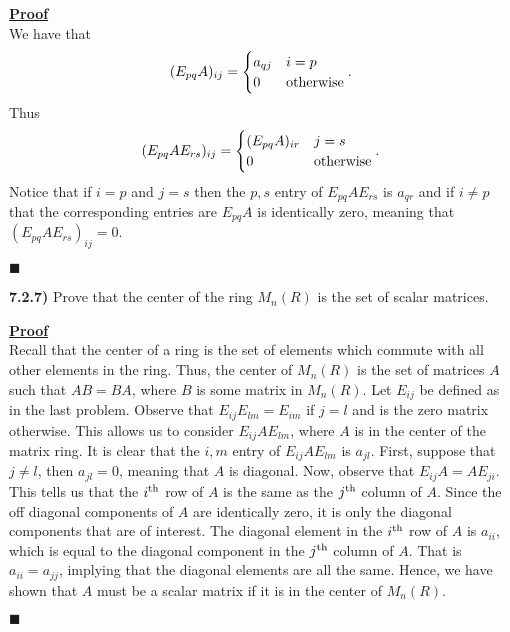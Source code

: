 \documentclass[12pt,a4paper]{article}
\newcommand{\prob}[2]{\textbf{#1)} #2}
\newenvironment{proof}
{
\textbf{\underline{Proof}} \\
}
{
\begin{flushright}
$\blacksquare$
\end{flushright}}
\begin{document}
\begin{proof}
    We have that
    \begin{align*}
        (E_{pq}A)_{ij} = \begin{cases}
            a_{qj} & i=p \\
            0 & {\rm otherwise}
        \end{cases}
    .\end{align*}   
    Thus 
    \begin{align*}
        (E_{pq}AE_{rs})_{ij} = \begin{cases}
            (E_{pq}A)_{ir} & j=s \\
            0 & {\rm otherwise}
        \end{cases}
    .\end{align*}
    Notice that if $i=p$ and $j=s$ then the $p,s$ entry of $E_{pq}AE_{rs}$ is $a_{qr}$ and if $i \ne p$ that the corresponding entries are $E_{pq}A$ is identically zero, meaning that $(E_{pq}AE_{rs})_{ij} = 0$.
\end{proof}

\prob{7.2.7}{
Prove that the center of the ring $M_{n}(R)$ is the set of scalar matrices.
}

\begin{proof}
    Recall that the center of a ring is the set of elements which commute with all other elements in the ring.
    Thus, the center of $M_{n}(R)$ is the set of matrices $A$ such that $AB = BA$, where $B$ is some matrix in $M_{n}(R)$.
    Let $E_{ij}$ be defined as in the last problem.
    Observe that $E_{ij}E_{lm} = E_{im}$ if $j=l$ and is the zero matrix otherwise. 
    This allows us to consider $E_{ij}AE_{lm}$, where $A$ is in the center of the matrix ring.
    It is clear that the $i,m$ entry of $E_{ij}AE_{lm}$ is $a_{jl}$.
    First, suppose that $j \ne l$, then $a_{jl} = 0$, meaning that $A$ is diagonal.
    Now, observe that $E_{ij}A = AE_{ji}$. This tells us that the $i^{\rm th}$ row of $A$ is the same as the $j^{\rm th}$ column of $A$.
    Since the off diagonal components of $A$ are identically zero, it is only the diagonal components that are of interest.
    The diagonal element in the $i^{\rm th}$ row of $A$ is $a_{ii}$, which is equal to the diagonal component in the $j^{\rm th}$ column of $A$.
    That is $a_{ii} = a_{jj}$, implying that the diagonal elements are all the same.
    Hence, we have shown that $A$ must be a scalar matrix if it is in the center of $M_{n}(R)$.
\end{proof}
\end{document}
